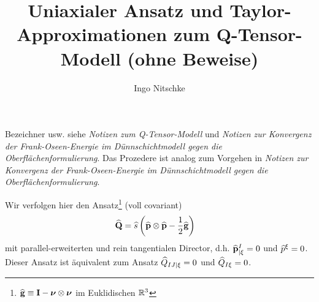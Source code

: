 \documentclass[a4paper,11pt]{scrartcl}
\title{Uniaxialer Ansatz und Taylor-Approximationen zum Q-Tensor-Modell (ohne Beweise)}
\author{Ingo Nitschke}
\newcommand{\Qb}{\mathbf{Q}}
\newcommand{\QExt}{\extend{\Qb}}
\newcommand{\QIExt}{\extend{Q}}
\begin{document}
\maketitle

Bezeichner usw. siehe \textit{Notizen zum Q-Tensor-Modell} und \textit{Notizen zur Konvergenz der Frank-Oseen-Energie im Dünnschichtmodell gegen die Oberflächenformulierung}.
Das Prozedere ist analog zum Vorgehen in \textit{Notizen zur Konvergenz der Frank-Oseen-Energie im Dünnschichtmodell gegen die Oberflächenformulierung}.

Wir verfolgen hier den Ansatz\footnote{\( \widehat{\mathbf{g}} \equiv \mathbf{I} - \boldsymbol{\nu} \otimes \boldsymbol{\nu} \) im Euklidischen \( \mathbb{R}^{3} \)} (voll covariant)
\begin{align}
  \QExt &= \extend{s}\left( \pExt\otimes\pExt - \frac{1}{2}\extend{\mathbf{g}} \right)
\end{align}
mit parallel-erweiterten und rein tangentialen Director, d.h. \( \mathbf{\widehat{p}}{^{I}_{|\xi}} = 0 \) und \( \widehat{p}^{\xi} = 0 \).
Dieser Ansatz ist äquivalent zum Ansatz \(  \QIExt_{IJ|\xi} = 0 \) und \( \QIExt_{I\xi} = 0 \).
\end{document}
